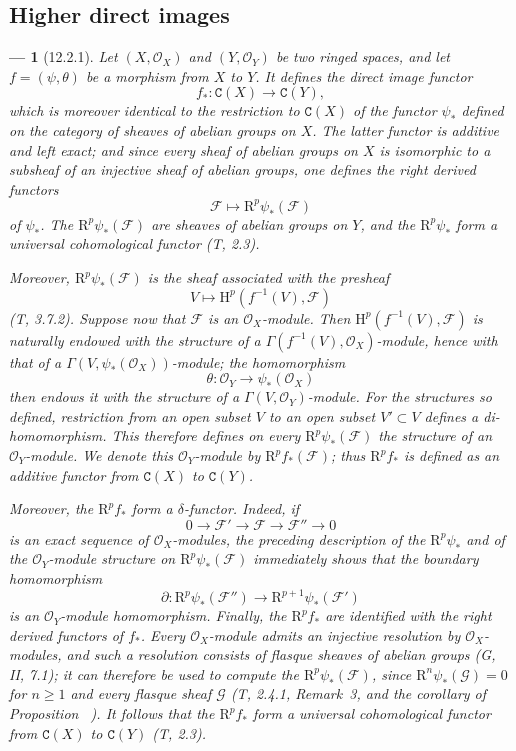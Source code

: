 \documentclass[oneside]{amsart}
\makeatletter
\theoremstyle{ega-env-style}
\newtheorem*{env}{---}
\theoremstyle{ega-thm-env-style}
\theoremstyle{ega-defn-env-style}
\def\mathcal{\mathscr}
\def\sh{\mathcal}                   %
\def\cat{\mathtt}                   %
\def\geq{\geqslant}                 %
\def\HH{\mathrm{H}}                 %
\def\RR{\mathrm{R}}                 %
\let\EGAOriginalLabel\label
\renewcommand{\label}[1]{\phantomsection\EGAOriginalLabel{#1}}
\let\EGAReaderOriginalHyperref\hyperref
\renewcommand{\hyperref}[2][]{%
  \@ifundefined{r@#1}{#2}{\EGAReaderOriginalHyperref[#1]{#2}}}
\makeatother
\begin{document}
\subsection{Higher direct images}
\label{subsection:0.12.2}

\begin{env}[12.2.1]
\label{0.12.2.1}
Let $(X,\sh{O}_X)$ and $(Y,\sh{O}_Y)$ be two ringed spaces, and let
$f=(\psi,\theta)$ be a morphism from $X$ to $Y$.  It defines the direct
image functor
\[
  f_*:\cat{C}(X)\longrightarrow\cat{C}(Y),
\]
which is moreover identical to the restriction to $\cat{C}(X)$ of the
functor $\psi_*$ defined on the category of sheaves of abelian groups
on $X$.
The latter functor is additive and left exact; and since every sheaf of
abelian groups on $X$ is isomorphic to a subsheaf of an injective sheaf
of abelian groups, one defines the right derived functors
\[
  \sh{F}\longmapsto\RR^p\psi_*(\sh{F})
\]
of $\psi_*$.  The $\RR^p\psi_*(\sh{F})$ are sheaves of abelian groups
on $Y$, and the $\RR^p\psi_*$ form a universal cohomological functor
(T, 2.3).

Moreover, $\RR^p\psi_*(\sh{F})$ is the sheaf associated with the
presheaf
\[
  V\longmapsto\HH^p(f^{-1}(V),\sh{F})
\]
(T, 3.7.2).
Suppose now that $\sh{F}$ is an $\sh{O}_X$-module.
Then $\HH^p(f^{-1}(V),\sh{F})$ is naturally endowed with the structure
of a $\Gamma(f^{-1}(V),\sh{O}_X)$-module, hence with that of a
$\Gamma(V,\psi_*(\sh{O}_X))$-module; the homomorphism
\[
  \theta:\sh{O}_Y\longrightarrow\psi_*(\sh{O}_X)
\]
then endows it with the structure of a
$\Gamma(V,\sh{O}_Y)$-module.
For the structures so defined, restriction from an open subset $V$ to
an open subset $V'\subset V$ defines a di-homomorphism.  This therefore
defines on every $\RR^p\psi_*(\sh{F})$ the structure of an
$\sh{O}_Y$-module.  We denote this $\sh{O}_Y$-module by
$\RR^p f_*(\sh{F})$; thus $\RR^p f_*$ is defined as an additive
functor from $\cat{C}(X)$ to $\cat{C}(Y)$.

Moreover, the $\RR^p f_*$ form a $\delta$-functor.  Indeed, if
\[
  0\longrightarrow\sh{F}'\longrightarrow\sh{F}
  \longrightarrow\sh{F}''\longrightarrow0
\]
is an exact sequence of $\sh{O}_X$-modules, the preceding description
of the $\RR^p\psi_*$ and of the $\sh{O}_Y$-module structure on
$\RR^p\psi_*(\sh{F})$ immediately shows that the boundary homomorphism
\[
  \partial:\RR^p\psi_*(\sh{F}'')
  \longrightarrow\RR^{p+1}\psi_*(\sh{F}')
\]
is an $\sh{O}_Y$-module homomorphism.
Finally, the $\RR^p f_*$ are identified with the right derived functors
of $f_*$.  Every $\sh{O}_X$-module admits an injective resolution by
$\sh{O}_X$-modules, and such a resolution consists of flasque sheaves
of abelian groups (G, II, 7.1); it can therefore be used to compute the
$\RR^p\psi_*(\sh{F})$, since $\RR^n\psi_*(\sh{G})=0$ for $n\geq1$
and every flasque sheaf $\sh{G}$ (T, 2.4.1, Remark~3, and the
corollary of Proposition~\hyperref[0.3.3.2]{3.3.2}).
It follows that the $\RR^p f_*$ form a universal cohomological functor
from $\cat{C}(X)$ to $\cat{C}(Y)$ (T, 2.3).
\end{env}
\end{document}
